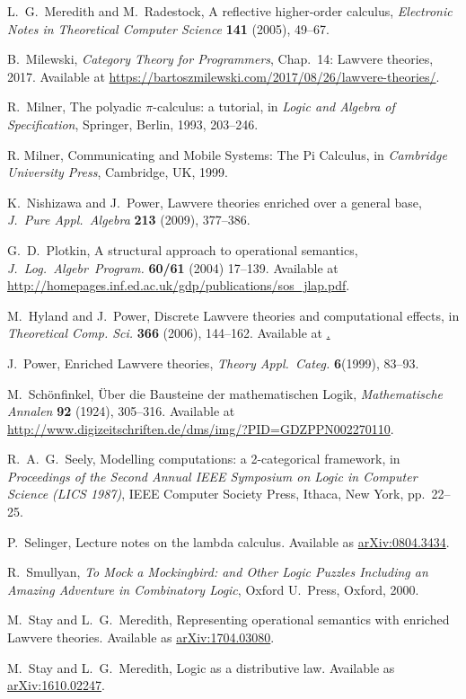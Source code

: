 \documentclass{amsart}
\theoremstyle{definition}
\begin{document}
\begin{thebibliography}{100}
 L.\ G.\ Meredith and M.\ Radestock, A reflective higher-order calculus,
\textsl{Electronic Notes in Theoretical Computer Science} \textbf{141} (2005), 49--67.

 B.\ Milewski, \textsl{Category Theory for Programmers}, Chap.\ 14: Lawvere theories, 2017.   Available at \href{https://bartoszmilewskiski.com/2017/08/26/lawvere-theories/}{https://bartoszmilewski.com/2017/08/26/lawvere-theories/}.

 R.\ Milner, The polyadic {$\pi$}-calculus: a tutorial, in \textsl{Logic and Algebra of Specification}, Springer, Berlin, 1993, 203--246.

 R. Milner, Communicating and Mobile Systems: The Pi Calculus, in \textsl{Cambridge University Press}, Cambridge, UK, 1999.

 K.\ Nishizawa and J.\ Power, Lawvere theories enriched over a general base, \textsl{J.\ Pure Appl.\ Algebra}  \textbf{213} (2009), 377--386.

 G.\ D.\ Plotkin, A structural approach to operational semantics, \textsl{J.\ Log.\ Algebr\ Program.} \textbf{60/61} (2004) 17--139.  Available at \href{http://homepages.inf.ed.ac.uk/gdp/publications/sos_jlap.pdf}{http://homepages.inf.ed.ac.uk/gdp/publications/sos\_jlap.pdf}.

 M.\ Hyland and J.\ Power, Discrete Lawvere theories and computational effects, in \textsl{Theoretical Comp.
Sci.} \textbf{366} (2006), 144--162. Available at \href{https://core.ac.uk/download/pdf/81105779.pdf}.
  
 J.\ Power, Enriched Lawvere theories, \textsl{Theory Appl.\ Categ.} \textbf{6}(1999), 83--93.

 M.\ Sch\"{o}nfinkel, \"Uber die Bausteine der mathematischen Logik, 
 \textsl{Mathematische Annalen} \textbf{92} (1924), 305--316.  Available at \href{http://www.digizeitschriften.de/dms/img/?PID=GDZPPN002270110}{http://www.digizeitschriften.de/dms/img/?PID=GDZPPN002270110}.
 
 R.\ A.\ G.\ Seely, Modelling computations: a 2-categorical framework, in
\textsl{Proceedings of the Second Annual IEEE Symposium on Logic in Computer Science (LICS 1987)}, IEEE Computer Society Press, Ithaca, New York, pp.\ 22--25.
 
  P.\ Selinger, Lecture notes on the lambda calculus.  Available as 
 \href{https://arxiv.org/abs/0804.3434}{arXiv:0804.3434}.

 R.\ Smullyan, \textsl{To Mock a Mockingbird: and Other Logic Puzzles Including an Amazing Adventure in Combinatory Logic}, Oxford U.\ Press, Oxford, 2000.
	
 M.\ Stay and L.\ G.\ Meredith, Representing operational semantics 
with enriched Lawvere theories.  Available as
\href{https://arxiv.org/abs/1704.03080}{arXiv:1704.03080}.

 M.\ Stay and L.\ G.\ Meredith, Logic as a distributive law.  Available as \href{https://arxiv.org/abs/1610.02247}{arXiv:1610.02247}.

\end{thebibliography}
\end{document}
